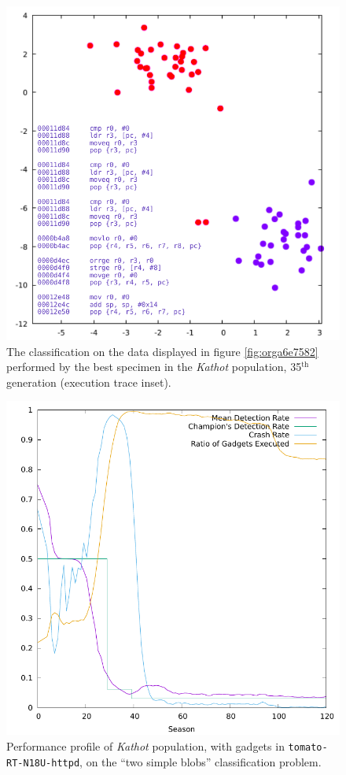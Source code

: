 \documentclass[12pt,glossary]{dalthesis}
\begin{document}
\begin{figure}[htbp]
\centering
\includegraphics[width=.9\linewidth]{../images/plots/kathot_champion_18916_blobs_disas.pdf}
\caption{\label{fig:orgbced812}
The classification on the data displayed in figure \ref{fig:orga6e7582} performed by the best specimen in the \emph{Kathot} population, 35\(^{\text{th}}\) generation (execution trace inset).}
\end{figure}

\begin{figure}[htbp]
\centering
\includegraphics[width=.9\linewidth]{../images/plots/kathot_fitness.pdf}
\caption{\label{fig:orge78f610}
Performance profile of \emph{Kathot} population, with gadgets in \texttt{tomato-RT-N18U-httpd}, on the ``two simple blobs'' classification problem.}
\end{figure}
\end{document}
